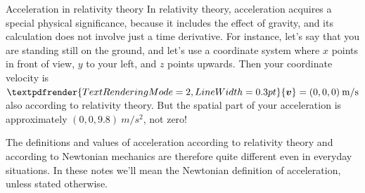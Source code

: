 \documentclass[a4paper,12pt,%
onecolumn,oneside,titlepage,%
british%
]{memoir}
\renewcommand*{\bm}[1]{\textpdfrender{TextRenderingMode=2,LineWidth=0.3pt}{\boldsymbol{#1}}}
\renewcommand*{\|}[1][]{\nonscript\:#1\vert\nonscript\:\mathopen{}}
\newcommand*{\yv}{\bm{v}}
\begin{document}
\begin{extra}{Acceleration in relativity theory}
  In relativity theory, acceleration acquires a special physical significance, because it includes the effect of gravity, and its calculation does not involve just a time derivative. For instance, let's say that you are standing still on the ground, and let's use a coordinate system where $x$ points in front of view, $y$ to your left, and $z$ points upwards. Then your coordinate velocity is $\yv=(0,0,0)\:\unit{m/s}$ also according to relativity theory. But the spatial part of your acceleration is approximately $(0,0,9.8)\:\unit{m/s^{2}}$, not zero!

  The definitions and values of acceleration according to relativity theory and according to Newtonian mechanics are therefore quite different even in everyday situations. In these notes we'll mean the Newtonian definition of acceleration, unless stated otherwise.
\end{extra}

\clearpage
\end{document}
